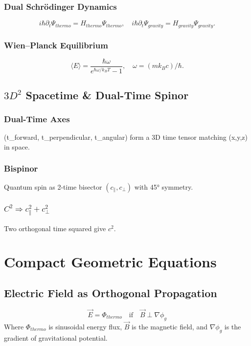 ﻿\documentclass[12pt]{article}
\begin{document}
\subsubsection{Dual Schr\"odinger Dynamics}
$$
i\hbar\partial_t\Psi_{thermo}=H_{thermo}\Psi_{thermo},\quad i\hbar\partial_t\Psi_{gravity}=H_{gravity}\Psi_{gravity}.
$$

\subsubsection{Wien–Planck Equilibrium}
$$\langle E\rangle=\frac{\hbar\omega}{e^{\hbar\omega/k_BT}-1},\quad\omega=(m k_B c)/\hbar.$$

\subsection{$3D^2$ Spacetime \& Dual-Time Spinor}

\subsubsection{Dual-Time Axes}
(t\_forward, t\_perpendicular, t\_angular) form a 3D time tensor matching (x,y,z) in space.

\subsubsection{Bispinor}
Quantum spin as 2-time bisector $(c_{\parallel}\!,c_{\perp})$ with 45° symmetry.

\subsubsection{$C^2 \Rightarrow c_{\parallel}^2 + c_{\perp}^2$}
Two orthogonal time squared give $c^2$.

\section{Compact Geometric Equations}

\subsection{Electric Field as Orthogonal Propagation}
$$ \vec{E} = \Phi_{thermo} \quad \text{if} \quad \vec{B} \perp \nabla\phi_g $$
Where $\Phi_{thermo}$ is sinusoidal energy flux, $\vec{B}$ is the magnetic field, and $\nabla\phi_g$ is the gradient of gravitational potential.
\end{document}
